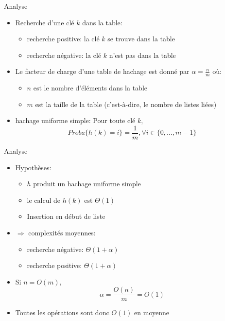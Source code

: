 \begin{frame}{Analyse}


\begin{itemize}
\item Recherche d'une clé $k$ dans la table:
\begin{itemize}
\item recherche positive: la clé $k$ se trouve dans la table
\item recherche négative: la clé $k$ n'est pas dans la table
\end{itemize}
\medskip
\item Le \alert{facteur de charge} d'une table de hachage est donné par $\alpha=\frac{n}{m}$ où:
\begin{itemize}
\item $n$ est le nombre d'éléments dans la table
\item $m$ est la taille de la table (c'est-à-dire, le nombre de listes liées)
\end{itemize}
\medskip
\item \alert{hachage uniforme simple}: Pour toute clé $k$,
$$Proba\{h(k)=i\}=\frac{1}{m}, \forall i\in\{0,\ldots,m-1\}$$

\end{itemize}

\end{frame}

\begin{frame}{Analyse}
\begin{itemize}
\item Hypothèses:
\begin{itemize}
\item $h$ produit un hachage uniforme simple
\item le calcul de $h(k)$ est $\Theta(1)$
\item Insertion en début de liste
\end{itemize}
\item $\Rightarrow$ complexités moyennes:
\begin{itemize}
\item recherche négative: $\Theta(1+\alpha)$
\item recherche positive: $\Theta(1+\alpha)$
\end{itemize}
\item Si $n=O(m)$, $$\alpha=\frac{O(n)}{m}=O(1)$$
\item Toutes les opérations sont donc $O(1)$ en moyenne
\end{itemize}
\end{frame}

